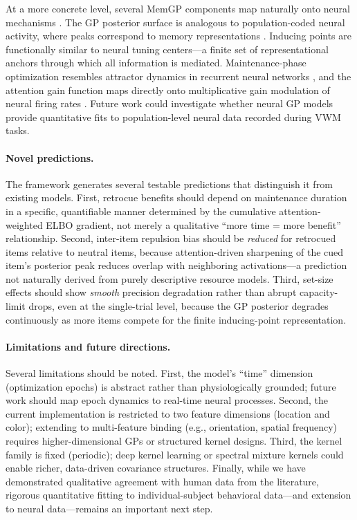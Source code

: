\documentclass[11pt,letterpaper]{article}
\begin{document}
At a more concrete level, several MemGP components map naturally onto neural mechanisms \cite{marrVision1982}. The GP posterior surface is analogous to population-coded neural activity, where peaks correspond to memory representations \cite{baysRepresentationComputationVisual2024, liNeuralPopulationDynamics2023}. Inducing points are functionally similar to neural tuning centers---a finite set of representational anchors through which all information is mediated. Maintenance-phase optimization resembles attractor dynamics in recurrent neural networks \cite{manoharNeuralMechanismsAttending2019}, and the attention gain function maps directly onto multiplicative gain modulation of neural firing rates \cite{carandiniNormalizationCanonicalNeural2012}. Future work could investigate whether neural GP models provide quantitative fits to population-level neural data recorded during VWM tasks.

\paragraph{Novel predictions.}
The framework generates several testable predictions that distinguish it from existing models. First, retrocue benefits should depend on maintenance duration in a specific, quantifiable manner determined by the cumulative attention-weighted ELBO gradient, not merely a qualitative ``more time = more benefit'' relationship. Second, inter-item repulsion bias should be \emph{reduced} for retrocued items relative to neutral items, because attention-driven sharpening of the cued item's posterior peak reduces overlap with neighboring activations---a prediction not naturally derived from purely descriptive resource models. Third, set-size effects should show \emph{smooth} precision degradation rather than abrupt capacity-limit drops, even at the single-trial level, because the GP posterior degrades continuously as more items compete for the finite inducing-point representation.

\paragraph{Limitations and future directions.}
Several limitations should be noted. First, the model's ``time'' dimension (optimization epochs) is abstract rather than physiologically grounded; future work should map epoch dynamics to real-time neural processes. Second, the current implementation is restricted to two feature dimensions (location and color); extending to multi-feature binding (e.g., orientation, spatial frequency) requires higher-dimensional GPs or structured kernel designs. Third, the kernel family is fixed (periodic); deep kernel learning \cite{gortlerVisualExplorationGaussian2019} or spectral mixture kernels could enable richer, data-driven covariance structures. Finally, while we have demonstrated qualitative agreement with human data from the literature, rigorous quantitative fitting to individual-subject behavioral data---and extension to neural data---remains an important next step.
\end{document}
